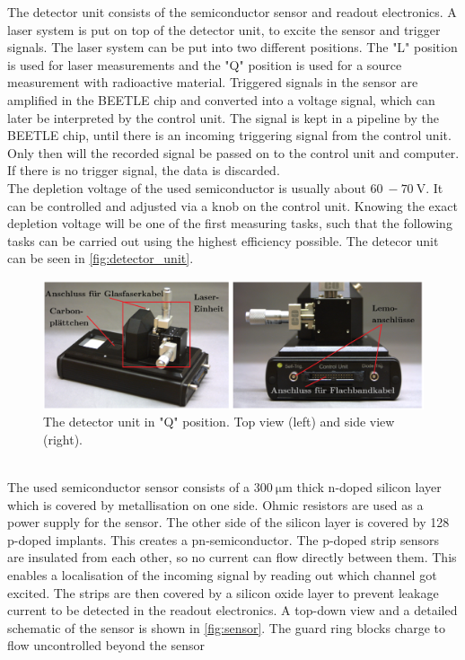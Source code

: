 The detector unit consists of the semiconductor sensor and readout electronics. A laser system is put on top
of the detector unit, to excite the sensor and trigger signals. The laser system can be put into two different
positions. The "L" position is used for laser measurements and the "Q" position is used for a source measurement
with radioactive material. Triggered signals in the sensor are
amplified in the BEETLE chip and converted into a voltage signal, which can later be interpreted by the control unit.
The signal is kept in a pipeline by the BEETLE chip, until there is an incoming triggering signal from the control unit. Only then will the recorded signal
be passed on to the control unit and computer. If there is no trigger signal, the data is discarded.\\
The depletion voltage of the used semiconductor is usually about $\qty{60}{} -  \qty{70}{\volt}$. It can be controlled and adjusted
via a knob on the control unit. Knowing the exact depletion voltage will be one of the first measuring tasks, such that the following
tasks can be carried out using the highest efficiency possible. The detecor unit can be seen in \autoref{fig:detector_unit}.
\begin{figure}
    \centering
    \includegraphics[width = .8\textwidth]{content/pics/detector_unit.png}
    \caption{The detector unit in "Q" position. Top view (left) and side view (right).\cite{SiliconStrip}}
    \label{fig:detector_unit}
\end{figure}\\
The used semiconductor sensor consists of a $\qty{300}{\micro\metre}$ thick n-doped silicon layer which is covered by metallisation
on one side. Ohmic resistors are used as a power supply for the sensor. The other side of the silicon layer is covered
by 128 p-doped implants. This creates a pn-semiconductor. The p-doped strip sensors are insulated from each other, so
no current can flow directly between them. This enables a localisation of the incoming signal by reading out which
channel got excited. The strips are then covered by a silicon oxide layer to prevent leakage current to be detected in the readout electronics.
A top-down view and a detailed schematic of the sensor is shown in \autoref{fig:sensor}. The guard ring blocks charge to flow uncontrolled beyond the sensor
